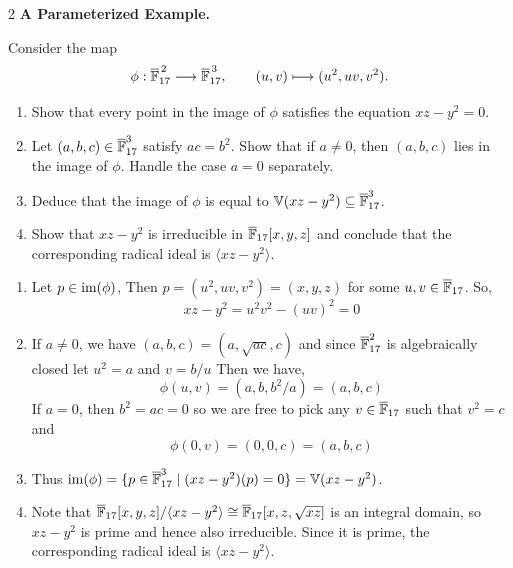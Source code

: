 \documentclass[Notebook.tex]{subfiles}
\begin{document}
\newpage 

\begin{problem}{2}
    \textbf{A Parameterized Example.} 
    
    Consider the map
    \[
    \phi:\overline{\mathbb F}_{17}^{\,2} \longrightarrow \overline{\mathbb F}_{17}^{\,3},
    \qquad
    (u,v) \longmapsto (u^2,uv,v^2).
    \]
    \begin{enumerate}
    \item Show that every point in the image of $\phi$ satisfies the equation $xz-y^2=0$.
    \item Let $(a,b,c)\in \overline{\mathbb F}_{17}^{3}$ satisfy $ac=b^2$. Show that if $a\neq 0$, then $(a,b,c)$ lies in the image of $\phi$. Handle the case $a=0$ separately.
    \item Deduce that the image of $\phi$ is equal to $\mathbb V(xz-y^2)\subseteq \overline{\mathbb F}_{17}^{3}$.

    \item Show that $xz-y^2$ is irreducible in $\overline{\mathbb F}_{17}[x,y,z]$ and conclude that the corresponding radical ideal is $\langle xz-y^2\rangle$.
    \end{enumerate}
\end{problem}

\begin{solution}
    \bbni
    \begin{enumerate}
        \item Let $p \in \operatorname{im}(\phi)$, Then $p = (u^2, uv, v^2) = (x,y,z)$ for some $u, v \in \overline{\mathbb F}_{17}$. So, 
        \[xz - y^2  = u^2v^2 - (uv)^2 = 0\]

        \item If $a \neq 0$, we have $(a, b, c) = (a, \sqrt{ac}, c)$ and since $\overline{\mathbb F}_{17}^2$ is algebraically closed let $u^2 = a$ and $v = b/u$ Then we have, 
        \[\phi(u, v) = (a, b, b^2/a) = (a, b, c)\]
        If $a = 0$, then $b^2 = ac = 0$ so we are free to pick any $v \in \overline{\mathbb F}_{17}$ such that $v^2 = c$ and 
        \[\phi(0, v) = (0, 0, c) = (a, b, c)\]

        \item Thus $\operatorname{im}(\phi) = \{p \in \overline{\mathbb F}_{17}^3 \mid (xz - y^2)(p) = 0\} = \mathbb V(xz - y^2)$.
        
        \item Note that $\overline{\mathbb F}_{17}[x,y,z]/\langle xz - y^2 \rangle \cong \overline{\mathbb F}_{17}[x,z, \sqrt{xz}]$ is an integral domain, so $xz - y^2$ is prime and hence also irreducible. Since it is prime, the corresponding radical ideal is $\langle xz - y^2 \rangle$. 
    \end{enumerate}
\end{solution}
\end{document}
